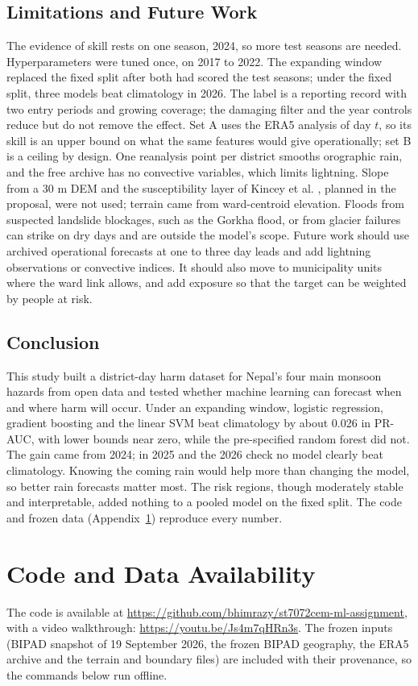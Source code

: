 \documentclass[conference]{IEEEtran}
\newcommand{\codeurl}{\url{https://github.com/bhimrazy/st7072cem-ml-assignment}}
\begin{document}
\subsection{Limitations and Future Work}
The evidence of skill rests on one season, 2024, so more test seasons are needed. Hyperparameters were tuned once, on 2017 to 2022. The expanding window replaced the fixed split after both had scored the test seasons; under the fixed split, three models beat climatology in 2026. The label is a reporting record with two entry periods and growing coverage; the damaging filter and the year controls reduce but do not remove the effect. Set A uses the ERA5 analysis of day $t$, so its skill is an upper bound on what the same features would give operationally; set B is a ceiling by design. One reanalysis point per district smooths orographic rain, and the free archive has no convective variables, which limits lightning. Slope from a 30 m DEM and the susceptibility layer of Kincey et al. \cite{Kincey2024,Kincey2023Data}, planned in the proposal, were not used; terrain came from ward-centroid elevation. Floods from suspected landslide blockages, such as the Gorkha flood, or from glacier failures can strike on dry days and are outside the model's scope. Future work should use archived operational forecasts at one to three day leads and add lightning observations or convective indices. It should also move to municipality units where the ward link allows, and add exposure so that the target can be weighted by people at risk.

\subsection{Conclusion}
This study built a district-day harm dataset for Nepal's four main monsoon hazards from open data and tested whether machine learning can forecast when and where harm will occur. Under an expanding window, logistic regression, gradient boosting and the linear SVM beat climatology by about 0.026 in PR-AUC, with lower bounds near zero, while the pre-specified random forest did not. The gain came from 2024; in 2025 and the 2026 check no model clearly beat climatology. Knowing the coming rain would help more than changing the model, so better rain forecasts matter most. The risk regions, though moderately stable and interpretable, added nothing to a pooled model on the fixed split. The code and frozen data (Appendix~\ref{app:run}) reproduce every number.

\appendices
\section{Code and Data Availability}
\label{app:run}
The code is available at \codeurl{}, with a video walkthrough: \url{https://youtu.be/Js4m7qHRn3s}. The frozen inputs (BIPAD snapshot of 19 September 2026, the frozen BIPAD geography, the ERA5 archive and the terrain and boundary files) are included with their  provenance, so the commands below run offline.
\end{document}
